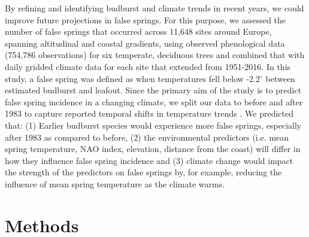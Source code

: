 \documentclass{article}\usepackage[]{graphicx}\usepackage[]{color}
\begin{document}
By refining and identifying budburst and climate trends in recent years, we could improve future projections in false springs. For this purpose, we assessed the number of false springs that occurred across 11,648 sites around Europe, spanning altitudinal and coastal gradients, using observed phenological data (754,786 observations) for six temperate, deciduous trees and combined that with daily gridded climate data for each site that extended from 1951-2016. In this study, a false spring was defined as when temperatures fell below -2.2$^{\circ}$ \citep{Schwartz1993} between estimated budburst and leafout. Since the primary aim of the study is to predict false spring incidence in a changing climate, we split our data to before and after 1983 to capture reported temporal shifts in temperature trends \citep{Kharouba2018, Stocker2013}. We predicted that: (1) Earlier budburst species would experience more false springs, especially after 1983 as compared to before, (2) the environmental predictors (i.e. mean spring temperature, NAO index, elevation, distance from the coast) will differ in how they influence false spring incidence and (3) climate change would impact the strength of the predictors on false springs by, for example, reducing the influence of mean spring temperature as the climate warms. 


\section*{Methods}
\end{document}
